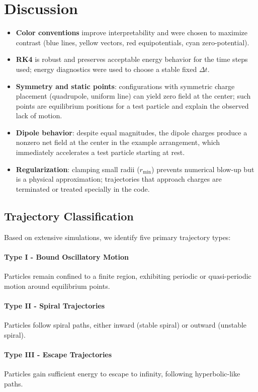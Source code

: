 \documentclass[12pt,a4paper]{article}
\begin{document}
\section{Discussion}
\begin{itemize}
    \item \textbf{Color conventions} improve interpretability and were chosen to maximize contrast (blue lines, yellow vectors, red equipotentials, cyan zero-potential).
    \item \textbf{RK4} is robust and preserves acceptable energy behavior for the time steps used; energy diagnostics were used to choose a stable fixed \(\Delta t\).
    \item \textbf{Symmetry and static points}: configurations with symmetric charge placement (quadrupole, uniform line) can yield zero field at the center; such points are equilibrium positions for a test particle and explain the observed lack of motion.
    \item \textbf{Dipole behavior}: despite equal magnitudes, the dipole charges produce a nonzero net field at the center in the example arrangement, which immediately accelerates a test particle starting at rest.
    \item \textbf{Regularization}: clamping small radii ($r_\text{min}$) prevents numerical blow-up but is a physical approximation; trajectories that approach charges are terminated or treated specially in the code.
\end{itemize}

\subsection{Trajectory Classification}
Based on extensive simulations, we identify five primary trajectory types: 

\paragraph{Type I - Bound Oscillatory Motion} 
Particles remain confined to a finite region, exhibiting periodic or quasi-periodic motion around equilibrium points. 

\paragraph{Type II - Spiral Trajectories} 
Particles follow spiral paths, either inward (stable spiral) or outward (unstable spiral). 

\paragraph{Type III - Escape Trajectories} 
Particles gain sufficient energy to escape to infinity, following hyperbolic-like paths. 
\end{document}
